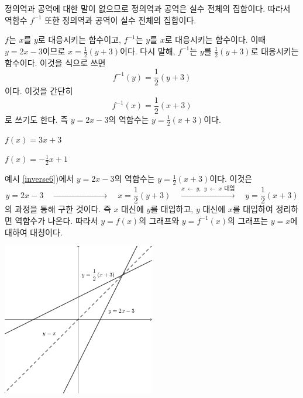 \documentclass{oblivoir}
\begin{document}
%
\label{inverse5}

\newpage
%
\label{inverse6}
\begin{mdframed}
정의역과 공역에 대한 말이 없으므로 정의역과 공역은 실수 전체의 집합이다.
따라서 역함수 \(f^{-1}\) 또한 정의역과 공역이 실수 전체의 집합이다.


\(f\)는 \(x\)를 \(y\)로 대응시키는 함수이고, \(f^{-1}\)는 \(y\)를 \(x\)로 대응시키는 함수이다.
이때  \(y=2x-3\)이므로 \(x=\frac12(y+3)\)이다.
다시 말해, \(f^{-1}\)는 \(y\)를 \(\frac12(y+3)\)로 대응시키는 함수이다.
이것을 식으로 쓰면
\[f^{-1}(y)=\frac12(y+3)\]
이다.
%
이것을 간단히
\[f^{-1}(x)=\frac12(x+3)\]
로 쓰기도 한다.
즉 \(y=2x-3\)의 역함수는 \(y=\frac12(x+3)\)이다.
\end{mdframed}

%
\label{inverse7}
\begin{enumerate*}[itemjoin={\tabto{0.5\textwidth}}]
\item
\(f(x)=3x+3\)
\item
\(f(x)=-\frac12x+1\)
\end{enumerate*}

\newpage
%
\exam{}\label{inverse8}
예시 \ref{inverse6})에서 \(y=2x-3\)의 역함수는 \(y=\frac12(x+3)\)이다.
이것은
\[y=2x-3
\quad\xrightarrow{\phantom{x\:\leftarrow\: y,\:\: y\:\leftarrow\: x\:\:대입}}\quad
x=\frac12(y+3)
\quad\xrightarrow{x\:\leftarrow\: y,\:\: y\:\leftarrow\: x\:\:대입}\quad
y=\frac12(x+3)
\]
의 과정을 통해 구한 것이다.
즉 \(x\) 대신에 \(y\)를 대입하고, \(y\) 대신에 \(x\)를 대입하여 정리하면 역함수가 나온다.
따라서 \(y=f(x)\)의 그래프와 \(y=f^{-1}(x)\)의 그래프는 \(y=x\)에 대하여 대칭이다.
\begin{center}
\includegraphics[width=0.5\textwidth]{inverse_6}
\end{center}
\end{document}
